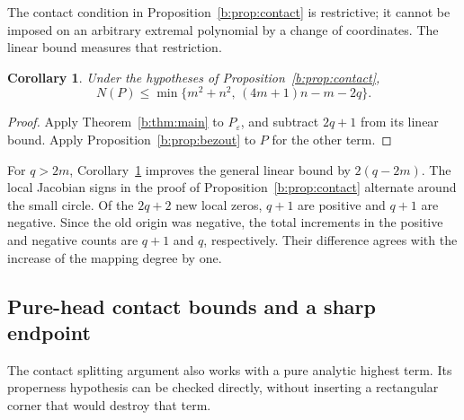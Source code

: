 \documentclass[UTF8,11pt]{ctexart}
\newtheorem{cor}[thm]{Corollary}
\theoremstyle{definition}
\numberwithin{equation}{section}
\newcommand{\eps}{\varepsilon}\newcommand{\ep}{\varepsilon}
\begin{document}
The contact condition in Proposition~\ref{b:prop:contact} is restrictive;
it cannot be imposed on an arbitrary extremal polynomial by a change
of coordinates. The linear bound measures that restriction.
\begin{cor}\label{b:cor:contactbound}
Under the hypotheses of Proposition~\ref{b:prop:contact},
\[
 N(P)\le
 \min\{m^2+n^2,\,(4m+1)n-m-2q\}.
\]
\end{cor}
\begin{proof}
Apply Theorem~\ref{b:thm:main} to $P_\eps$, and subtract $2q+1$
from its linear bound. Apply Proposition~\ref{b:prop:bezout} to $P$
for the other term.
\end{proof}

For $q>2m$, Corollary~\ref{b:cor:contactbound} improves the general
linear bound by $2(q-2m)$. The local Jacobian signs in the proof
of Proposition~\ref{b:prop:contact} alternate around the small
circle. Of the $2q+2$ new local zeros, $q+1$ are positive and
$q+1$ are negative. Since the old origin was negative, the total
increments in the positive and negative counts are $q+1$ and $q$,
respectively. Their difference agrees with the increase of the
mapping degree by one.

\subsection{Pure-head contact bounds and a sharp endpoint}
\label{v14:sec:purecontact}

The contact splitting argument also works with a pure analytic
highest term. Its properness hypothesis can be checked directly,
without inserting a rectangular corner that would destroy that term.
\end{document}
